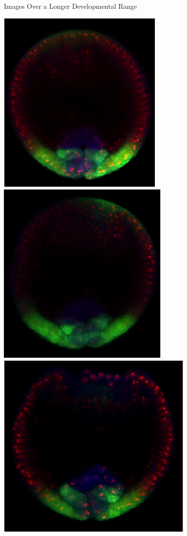 \documentclass[10pt]{beamer}
\begin{document}
\begin{frame}{Images Over a Longer Developmental Range}
\begin{center}
\vspace{0.1in}
\includegraphics[width=\imwidth]{longtime7}
\hspace{0.2in}
\includegraphics[width=\imwidth]{longtime8}
\hspace{0.2in}
\includegraphics[width=\imwidth]{longtime9}

\end{center}
\end{frame}
\end{document}
